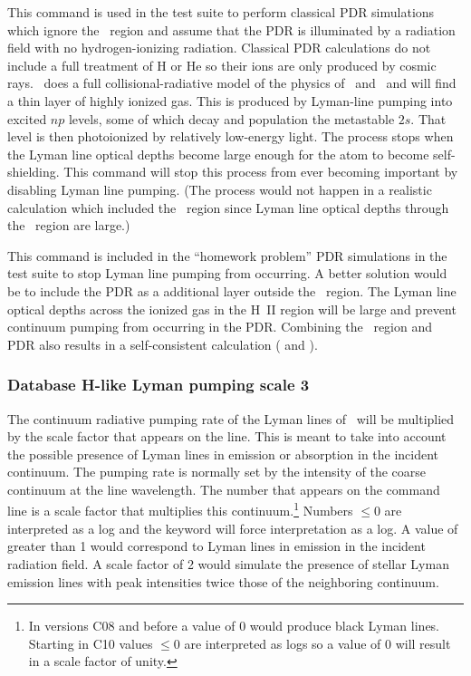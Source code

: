 This command is used in the test suite to perform classical PDR
simulations which ignore the \hplus\ region and assume that the PDR is
illuminated by a radiation field with no hydrogen-ionizing radiation.
Classical PDR calculations do not include a full treatment of H or He so
their ions are only produced by cosmic rays.
\Cloudy\ does a full collisional-radiative model
of the physics of \hO\ and \heO\
and will find a thin layer of highly ionized
gas.
This is produced by Lyman-line pumping into excited $np$ levels, some of which decay and
population the metastable $2s$.
That level is then photoionized by relatively low-energy light.
The process stops when the Lyman line optical depths become large enough
for the atom to become self-shielding.
This command will stop this
process from ever becoming important by disabling Lyman line pumping.
(The process would not happen in a realistic calculation
which included the \hplus\ region since Lyman line optical depths
through the \hplus\ region are large.)

This command is included in the ``homework problem'' PDR simulations
in the test suite to
stop Lyman line pumping from occurring.
A better solution would be to include
the PDR as a additional layer outside the \hplus\ region.
The Lyman line
optical depths across the ionized gas in the H~II region will be large and prevent continuum
pumping from occurring in the PDR.
Combining the \hii\ region and PDR also
results in a self-consistent calculation
(\citealp{Abel2005} and \citealp{Abel2008} ).

\subsubsection{Database H-like Lyman pumping scale 3}
The continuum radiative pumping rate
of the Lyman lines of \hi\ will be multiplied by the scale factor
that appears on the line.
This is meant to take into account the possible presence of
Lyman lines in emission or absorption in the incident continuum.
The pumping
rate is normally set by the intensity of the coarse continuum at the line
wavelength.
The number that appears on the command line is a scale factor
that multiplies this continuum.\footnote{In versions C08 and before a value of 0 would produce black Lyman lines.
Starting in C10 values $\le 0$ are interpreted as logs
so a value of 0 will result in a scale factor of unity.}
Numbers $\le 0$ are interpreted as a log and
the  keyword will force interpretation as a log.
A value of greater than 1 would correspond to Lyman lines
in emission in the incident radiation field.
A scale factor of 
2 would simulate the presence of stellar Lyman emission lines with peak
intensities twice those of the neighboring continuum.

